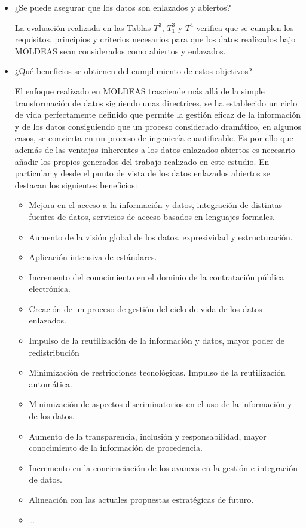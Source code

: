\begin{itemize}
 \item ¿Se puede asegurar que los datos son enlazados y abiertos?

La evaluación realizada en las Tablas $T^{3}$, $T^{3}_1$ y $T^{4}$ verifica que se cumplen los requisitos, principios y criterios 
necesarios para que los datos realizados bajo \gls{MOLDEAS} sean considerados como abiertos y enlazados.


 \item ¿Qué beneficios se obtienen del cumplimiento de estos objetivos?

El enfoque realizado en MOLDEAS trasciende más allá de la simple transformación de datos siguiendo unas directrices, se ha 
establecido un ciclo de vida perfectamente definido que permite la gestión eficaz de la información y de los datos consiguiendo 
que un proceso considerado dramático, en algunos casos, se convierta en un proceso de ingeniería cuantificable. Es por ello que 
además de las ventajas inherentes a los datos enlazados abiertos es necesario añadir los propios generados del trabajo realizado 
en este estudio. En particular y desde el punto de vista de los datos enlazados abiertos se destacan los siguientes 
beneficios:
\begin{itemize}
  \item Mejora en el acceso a la información y datos, integración de distintas fuentes de datos, servicios de acceso 
basados en lenguajes formales.
 \item Aumento de la visión global de los datos, expresividad y estructuración.
 \item Aplicación intensiva de estándares.
 \item Incremento del conocimiento en el dominio de la contratación pública electrónica.
 \item Creación de un proceso de gestión del ciclo de vida de los datos enlazados.
 \item Impulso de la reutilización de la información y datos, mayor poder de redistribución
 \item Minimización de restricciones tecnológicas. Impulso de la reutilización automática.
 \item Minimización de aspectos discriminatorios en el uso de la información y de los datos.
 \item Aumento de la transparencia, inclusión y responsabilidad, mayor conocimiento de la información 
de procedencia.
\item Incremento en la concienciación de los avances en la gestión e integración de datos.
\item Alineación con las actuales propuestas estratégicas de futuro.
\item \ldots
\end{itemize}

\end{itemize}


